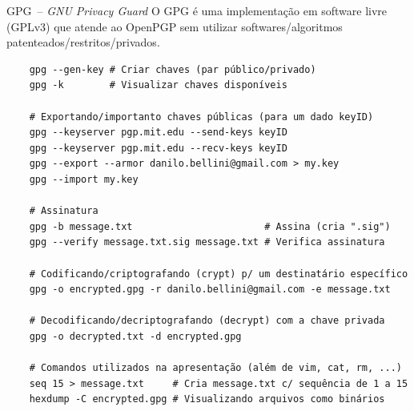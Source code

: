 \documentclass[utf8]{beamer}
\begin{document}
\begin{frame}[fragile]{GPG~-- \emph{GNU Privacy Guard}}
  O GPG é uma implementação em software livre (GPLv3)
  que atende ao OpenPGP
  sem utilizar softwares/algoritmos patenteados/restritos/privados.
  \begin{verbatim}
    gpg --gen-key # Criar chaves (par público/privado)
    gpg -k        # Visualizar chaves disponíveis

    # Exportando/importanto chaves públicas (para um dado keyID)
    gpg --keyserver pgp.mit.edu --send-keys keyID
    gpg --keyserver pgp.mit.edu --recv-keys keyID
    gpg --export --armor danilo.bellini@gmail.com > my.key
    gpg --import my.key

    # Assinatura
    gpg -b message.txt                       # Assina (cria ".sig")
    gpg --verify message.txt.sig message.txt # Verifica assinatura

    # Codificando/criptografando (crypt) p/ um destinatário específico
    gpg -o encrypted.gpg -r danilo.bellini@gmail.com -e message.txt

    # Decodificando/decriptografando (decrypt) com a chave privada
    gpg -o decrypted.txt -d encrypted.gpg

    # Comandos utilizados na apresentação (além de vim, cat, rm, ...)
    seq 15 > message.txt     # Cria message.txt c/ sequência de 1 a 15
    hexdump -C encrypted.gpg # Visualizando arquivos como binários
  \end{verbatim}
\end{frame}
\end{document}
